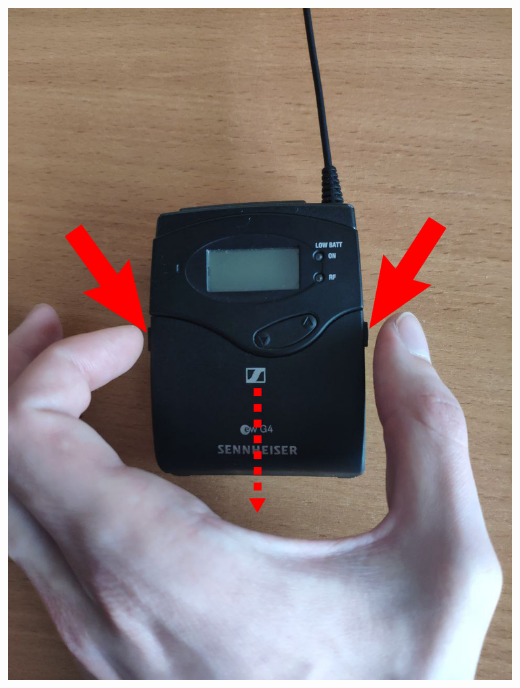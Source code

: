 \begin{enumerate}
\begin{enumerate}
                \begin{minipage}[c]{0.29\textwidth}
                  \includegraphics[width=\textwidth]{Images/PortableCamera/micro/step10.2-1-micro-open.jpg}
                \end{minipage}
                \hfill
                \begin{minipage}[c]{0.29\textwidth}

\end{minipage}
\end{enumerate}
\end{enumerate}
